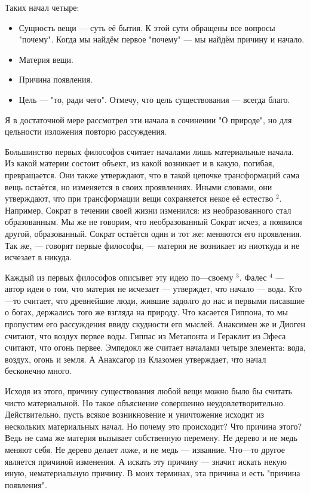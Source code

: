 \documentclass[oneside, 17pt, dvipsnames]{extbook}
\begin{document}
Таких начал четыре:
\begin{itemize}
\item Сущность вещи --- суть её бытия. К этой сути обращены все вопросы "почему". Когда мы найдём первое "почему" --- мы найдём причину и начало.
\item Материя вещи.
\item Причина появления.
\item Цель --- "то, ради чего". Отмечу, что цель существования --- всегда благо.
\end{itemize}

Я в достаточной мере рассмотрел эти начала в сочинении "О природе", но для цельности изложения повторю рассуждения.

Большинство первых философов считает началами лишь материальные начала. Из какой материи состоит объект, из какой возникает и в какую, погибая, превращается. Они также утверждают, что в такой цепочке трансформаций сама вещь остаётся, но изменяется в своих проявлениях. Иными словами, они утверждают, что при трансформации вещи сохраняется некое её естество $^2$. Например, Сократ в течении своей жизни изменился: из необразованного стал образованным. Мы же не говорим, что необразованный Сократ исчез, а появился другой, образованный. Сократ остаётся один и тот же: меняются его проявления. Так же, --- говорят первые философы, --- материя не возникает из ниоткуда и не исчезает в никуда.

Каждый из первых философов описывет эту идею по---своему $^3$. Фалес $^4$ --- автор идеи о том, что материя не исчезает --- утверждет, что начало --- вода. Кто---то считает, что древнейшие люди, жившие задолго до нас и первыми писавшие о богах, держались того же взгляда на природу. Что касается Гиппона, то мы пропустим его рассуждения ввиду скудности его мыслей. Анаксимен же и Диоген считают, что воздух первее воды. Гиппас из Метапонта и Гераклит из Эфеса считают, что огонь первее. Эмпедокл же считает началами четыре элемента: вода, воздух, огонь и земля. А Анаксагор из Клазомен утверждает, что начал бесконечно много.

Исходя из этого, причину существования любой вещи можно было бы считать чисто материальной. Но такое объяснение совершенно неудовлетворительно. Действительно, пусть всякое возникновение и уничтожение исходит из нескольких материальных начал. Но почему это происходит? Что причина этого? Ведь не сама же материя вызывает собственную перемену. Не дерево и не медь меняют себя. Не дерево делает ложе, и не медь --- изваяние. Что---то другое является причиной изменения. А искать эту причину --- значит искать некую иную, нематериальную причину. В моих терминах, эта причина и есть "причина появления".
\end{document}
